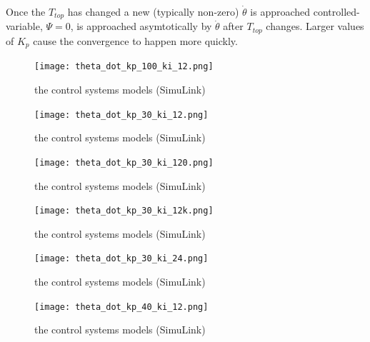 \documentclass{article}
\begin{document}
Once the $T_{top}$ has changed a new (typically non-zero)
$\dot{\theta}$ is approached controlled-variable, $\Psi = 0$,
is approached asymtotically by $\dot{\theta}$
after $T_{top}$ changes.
Larger values of $K_p$ cause the convergence
to happen more quickly.

\begin{figure}[h!]
\centering
\texttt{[image: theta\_dot\_kp\_100\_ki\_12.png]}
\caption{the control systems models (SimuLink)}
\label{fig:td_100_12}
\end{figure}


\begin{figure}[h!]
\centering
\texttt{[image: theta\_dot\_kp\_30\_ki\_12.png]}
\caption{the control systems models (SimuLink)}
\label{fig:td_30_12}
\end{figure}

\begin{figure}[h!]
\centering
\texttt{[image: theta\_dot\_kp\_30\_ki\_120.png]}
\caption{the control systems models (SimuLink)}
\label{fig:td_30_120}
\end{figure}

\begin{figure}[h!]
\centering
\texttt{[image: theta\_dot\_kp\_30\_ki\_12k.png]}
\caption{the control systems models (SimuLink)}
\label{fig:td_30_1200}
\end{figure}

\begin{figure}[h!]
\centering
\texttt{[image: theta\_dot\_kp\_30\_ki\_24.png]}
\caption{the control systems models (SimuLink)}
\label{fig:td_30_24}
\end{figure}

\begin{figure}[h!]
\centering
\texttt{[image: theta\_dot\_kp\_40\_ki\_12.png]}
\caption{the control systems models (SimuLink)}
\label{fig:td_40_12}
\end{figure}



\end{document}
